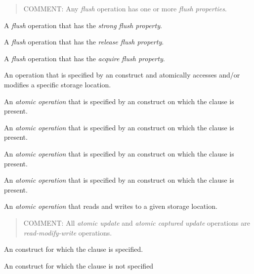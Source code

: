\begin{quote}
COMMENT: Any \emph{flush} operation has one or more \emph{flush properties}.
\end{quote}
\glossarydefend

\glossarydefstart
A \emph{flush} operation that has the \emph{strong flush property}.
\glossarydefend

\glossarydefstart
A \emph{flush} operation that has the \emph{release flush property}.
\glossarydefend

\glossarydefstart
A \emph{flush} operation that has the \emph{acquire flush property}.
\glossarydefend

\glossarydefstart
An operation that is specified by an  construct and atomically
accesses and/or modifies a specific storage location.
\glossarydefend

\glossarydefstart
An \emph{atomic operation} that is specified by an  construct 
on which the  clause is present.
\glossarydefend

\glossarydefstart
An \emph{atomic operation} that is specified by an  construct 
on which the  clause is present.
\glossarydefend

\glossarydefstart
An \emph{atomic operation} that is specified by an  construct 
on which the  clause is present.
\glossarydefend

\glossarydefstart
An \emph{atomic operation} that is specified by an  construct 
on which the  clause is present.
\glossarydefend

\glossarydefstart
An \emph{atomic operation} that reads and writes to a given storage location.

\begin{quote}
COMMENT: All \emph{atomic update} and \emph{atomic captured update} operations
are \emph{read-modify-write} operations.
\end{quote}
\glossarydefend

\glossarydefstart
An  construct for which the  clause is specified.
\glossarydefend
\bigskip

\glossarydefstart
An  construct for which the  clause is not specified
\glossarydefend
\bigskip
\bigskip

